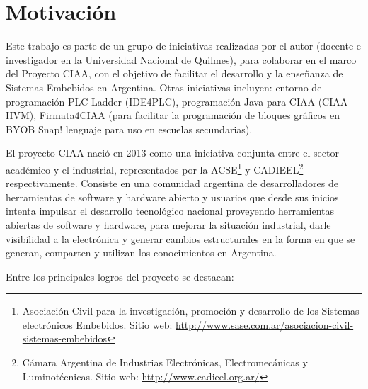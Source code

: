 \section{Motivación}
\label{sec:motivacion}

Este trabajo es parte de un grupo de iniciativas realizadas por el autor (docente e investigador en la Universidad Nacional de Quilmes), para colaborar en el marco del Proyecto CIAA, con el objetivo de facilitar el desarrollo y la enseñanza de Sistemas Embebidos en Argentina. Otras iniciativas incluyen: entorno de programación PLC Ladder (IDE4PLC), programación Java para CIAA (CIAA-HVM), Firmata4CIAA (para facilitar la programación de bloques gráficos en BYOB Snap! lenguaje para uso en escuelas secundarias). 

El proyecto CIAA nació en 2013 como una iniciativa conjunta entre el sector académico y el industrial, representados por la ACSE\footnote{Asociación Civil para la investigación, promoción y desarrollo de los Sistemas electrónicos Embebidos. Sitio web: \url{http://www.sase.com.ar/asociacion-civil-sistemas-embebidos}} y CADIEEL\footnote{Cámara Argentina de Industrias Electrónicas, Electromecánicas y Luminotécnicas. Sitio web: \url{http://www.cadieel.org.ar/}} respectivamente. Consiste en una comunidad argentina de desarrolladores de herramientas de software y hardware abierto y usuarios que desde sus inicios intenta impulsar el desarrollo tecnológico nacional proveyendo herramientas abiertas de software y hardware, para mejorar la situación industrial, darle visibilidad a la electrónica y generar cambios estructurales en la forma en que se generan, comparten y utilizan los conocimientos en Argentina.

Entre los principales logros del proyecto se destacan:

